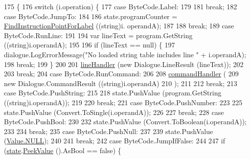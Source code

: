 \begin{DoxyCode}
175                                                     \{
176             \textcolor{keywordflow}{switch} (i.operation) \{
177             \textcolor{keywordflow}{case} ByteCode.Label:
179 
181                 \textcolor{keywordflow}{break};
182             \textcolor{keywordflow}{case} ByteCode.JumpTo:
184 
186                 state.programCounter = \hyperlink{a00152_af613c8b2d098678b6ea05b509c0a0cb6}{FindInstructionPointForLabel} ((\textcolor{keywordtype}{string})i.
      operandA);
187 
188                 \textcolor{keywordflow}{break};
189             \textcolor{keywordflow}{case} ByteCode.RunLine:
191 
194                 var lineText = program.GetString ((string)i.operandA);
195 
196                 \textcolor{keywordflow}{if} (lineText == null) \{
197                     dialogue.LogErrorMessage(\textcolor{stringliteral}{"No loaded string table includes line "} + i.operandA);
198                     \textcolor{keywordflow}{break};
199                 \}
200 
201                 \hyperlink{a00152_a29b30454f068fc7e107d48bff4346fd9}{lineHandler} (\textcolor{keyword}{new} Dialogue.LineResult (lineText));
202 
203                 \textcolor{keywordflow}{break};
204             \textcolor{keywordflow}{case} ByteCode.RunCommand:
206 
208                 \hyperlink{a00152_ab89b02227b92c74552f719afd47848e4}{commandHandler} (
209                     \textcolor{keyword}{new} Dialogue.CommandResult ((\textcolor{keywordtype}{string})i.operandA)
210                 );
211 
212                 \textcolor{keywordflow}{break};
213             \textcolor{keywordflow}{case} ByteCode.PushString:
215 
218                 state.PushValue (program.GetString ((string)i.operandA));
219 
220                 \textcolor{keywordflow}{break};
221             \textcolor{keywordflow}{case} ByteCode.PushNumber:
223 
225                 state.PushValue (Convert.ToSingle(i.operandA));
226 
227                 \textcolor{keywordflow}{break};
228             \textcolor{keywordflow}{case} ByteCode.PushBool:
230 
232                 state.PushValue (Convert.ToBoolean(i.operandA));
233 
234                 \textcolor{keywordflow}{break};
235             \textcolor{keywordflow}{case} ByteCode.PushNull:
237 
239                 state.PushValue (\hyperlink{a00177_a1ed2964965baca8621c45efa23f37660}{Value.NULL});
240 
241                 \textcolor{keywordflow}{break};
242             \textcolor{keywordflow}{case} ByteCode.JumpIfFalse:
244 
247                 \textcolor{keywordflow}{if} (\hyperlink{a00152_a70f2ce6201cdd2430ceaa764ac614ca0}{state}.\hyperlink{a00155_a54fd5b64ec94e937e771846167242dc2}{PeekValue} ().AsBool == \textcolor{keyword}{false}) \{

\end{DoxyCode}
